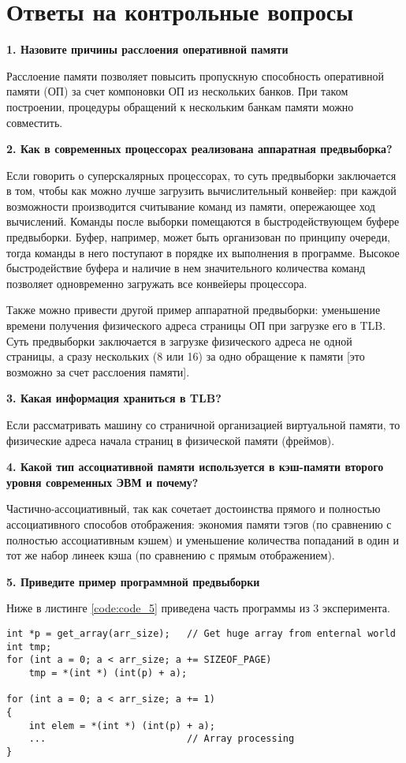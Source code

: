 \newpage

\section{Ответы на контрольные вопросы}

\textbf{1. Назовите причины расслоения оперативной памяти}

Расслоение памяти позволяет повысить пропускную способность оперативной памяти (ОП) за счет компоновки ОП из нескольких банков. При таком построении, процедуры обращений к нескольким банкам памяти можно совместить.

\textbf{2. Как в современных процессорах реализована аппаратная предвыборка?}

Если говорить о суперскалярных процессорах, то суть предвыборки заключается в том, чтобы как можно лучше загрузить вычислительный конвейер: при каждой возможности производится считывание команд из памяти, опережающее ход вычислений. Команды после выборки помещаются в быстродействующем буфере предвыборки. Буфер, например, может быть организован по принципу очереди, тогда команды в него поступают в порядке их выполнения в программе. Высокое быстродействие буфера и наличие в нем значительного количества команд позволяет одновременно загружать все конвейеры процессора.

Также можно привести другой пример аппаратной предвыборки: уменьшение времени получения физического адреса страницы ОП при загрузке его в TLB. Суть предвыборки заключается в загрузке физического адреса не одной страницы, а сразу нескольких (8 или 16) за одно обращение к памяти [это возможно за счет расслоения памяти].

\textbf{3. Какая информация храниться в TLB?}

Если рассматривать машину со страничной организацией виртуальной памяти, то физические адреса начала страниц в физической памяти (фреймов).

\textbf{4. Какой тип ассоциативной памяти используется в кэш-памяти второго уровня современных ЭВМ и почему?}

Частично-ассоциативный, так как сочетает  достоинства  прямого  и  полностью  ассоциативного  способов отображения: экономия памяти тэгов (по сравнению с полностью ассоциативным кэшем) и уменьшение количества попаданий в один и тот же набор линеек кэша (по сравнению с прямым отображением).

\textbf{5. Приведите пример программной предвыборки}

Ниже в листинге \ref{code:code_5} приведена часть программы из 3 эксперимента.

\begin{lstlisting}[label=code:code_5, caption=Пример программной предвыборки]
int *p = get_array(arr_size);	// Get huge array from enternal world
int tmp;
for (int a = 0; a < arr_size; a += SIZEOF_PAGE)
	tmp = *(int *) (int(p) + a);

for (int a = 0; a < arr_size; a += 1)
{
	int elem = *(int *) (int(p) + a);
	...							// Array processing
}
\end{lstlisting}